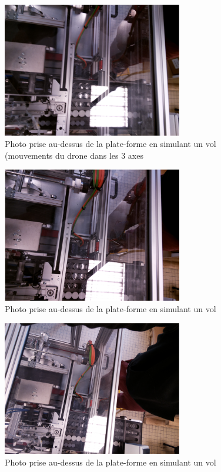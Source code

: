\documentclass[12pt]{beamer}
\begin{document}
\begin{frame}[allowframebreaks]
        \begin{figure}
            \centering
            \includegraphics[width=0.7\textwidth]{imageStatioSup1.png}
            \caption*{Photo prise au-dessus de la plate-forme en simulant un vol (mouvements du drone dans les 3 axes}
        \end{figure}
        
        \begin{figure}
            \centering
            \includegraphics[width=0.7\textwidth]{imageStatioSup2.png}
            \caption*{Photo prise au-dessus de la plate-forme en simulant un vol}
        \end{figure}
        
        \begin{figure}
            \centering
            \includegraphics[width=0.7\textwidth]{imageStatioSup3.png}
            \caption*{Photo prise au-dessus de la plate-forme en simulant un vol}
        \end{figure}	
	\end{frame}
\end{document}
